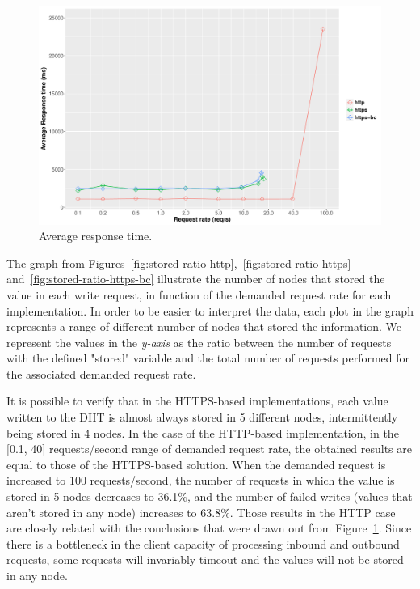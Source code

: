 \begin{figure}[h!]
  \centering
  \includegraphics[scale=0.4]{Figures/evaluation/average-response-time.pdf}
  \caption{Average response time.}
  \label{fig:average-response-time}
\end{figure}


The graph from Figures~\ref{fig:stored-ratio-http},~\ref{fig:stored-ratio-https} and~\ref{fig:stored-ratio-https-bc} illustrate the number of nodes that stored the value in each write request, in function of the demanded request rate for each implementation.
In order to be easier to interpret the data, each plot in the graph represents a range of different number of nodes that stored the information.
We represent the values in the \textit{y-axis} as the ratio between the number of requests with the defined "stored" variable and the total number of requests performed for the associated demanded request rate.

It is possible to verify that in the HTTPS-based implementations, each value written to the DHT is almost always stored in 5 different nodes, intermittently being stored in 4 nodes.
In the case of the HTTP-based implementation, in the [0.1, 40] requests/second range of demanded request rate, the obtained results are equal to those of the HTTPS-based solution.
When the demanded request is increased to 100 requests/second, the number of requests in which the value is stored in 5 nodes decreases to 36.1\%, and the number of failed writes (values that aren't stored in any node) increases to 63.8\%.
Those results in the HTTP case are closely related with the conclusions that were drawn out from Figure~\ref{fig:average-response-time}.
Since there is a bottleneck in the client capacity of processing inbound and outbound requests, some requests will invariably timeout and the values will not be stored in any node.

